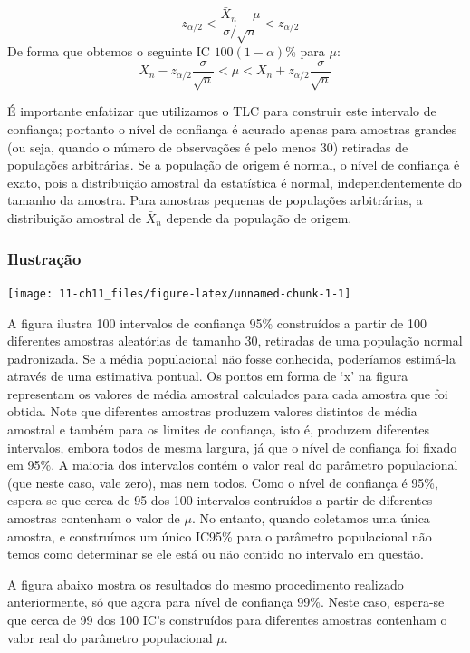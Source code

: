 \documentclass[
]{book}
\theoremstyle{definition}
\theoremstyle{definition}
\theoremstyle{definition}
\theoremstyle{remark}
\begin{document}
\[-z_{\alpha/2} < \frac{\bar{X}_n - \mu}{\sigma/\sqrt{n}} < z_{\alpha/2}\]
De forma que obtemos o seguinte IC \(100(1-\alpha)\)\% para \(\mu\):
\[\bar{X}_n - z_{\alpha/2}\frac{\sigma}{\sqrt{n}} < \mu < \bar{X}_n  + z_{\alpha/2}\frac{\sigma}{\sqrt{n}}\]

É importante enfatizar que utilizamos o TLC para construir este intervalo de confiança; portanto o nível de confiança é acurado apenas para amostras grandes (ou seja, quando o número de observações é pelo menos 30) retiradas de populações arbitrárias. Se a população de origem é normal, o nível de confiança é exato, pois a distribuição amostral da estatística é normal, independentemente do tamanho da amostra. Para amostras pequenas de populações arbitrárias, a distribuição amostral de \(\bar{X}_n\) depende da população de origem.

\hypertarget{ilustrauxe7uxe3o}{%
\subsubsection*{Ilustração}\label{ilustrauxe7uxe3o}}

\texttt{[image: 11-ch11\_files/figure-latex/unnamed-chunk-1-1]}

A figura ilustra 100 intervalos de confiança 95\% construídos a partir de 100 diferentes amostras aleatórias de tamanho 30, retiradas de uma população normal padronizada. Se a média populacional não fosse conhecida, poderíamos estimá-la através de uma estimativa pontual. Os pontos em forma de `x' na figura representam os valores de média amostral calculados para cada amostra que foi obtida. Note que diferentes amostras produzem valores distintos de média amostral e também para os limites de confiança, isto é, produzem diferentes intervalos, embora todos de mesma largura, já que o nível de confiança foi fixado em 95\%. A maioria dos intervalos contém o valor real do parâmetro populacional (que neste caso, vale zero), mas nem todos. Como o nível de confiança é 95\%, espera-se que cerca de 95 dos 100 intervalos contruídos a partir de diferentes amostras contenham o valor de \(\mu\). No entanto, quando coletamos uma única amostra, e construímos um único IC95\% para o parâmetro populacional não temos como determinar se ele está ou não contido no intervalo em questão.

A figura abaixo mostra os resultados do mesmo procedimento realizado anteriormente, só que agora para nível de confiança 99\%. Neste caso, espera-se que cerca de 99 dos 100 IC's construídos para diferentes amostras contenham o valor real do parâmetro populacional \(\mu\).
\end{document}

